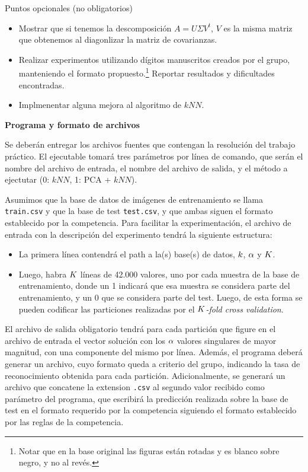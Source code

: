 Puntos opcionales (no obligatorios)

\begin{itemize}
\item Mostrar que si tenemos la descomposici\'on $A = U\Sigma V^t$, $V$ es la misma matriz que obtenemos al diagonlizar la matriz de covarianzas.
\item Realizar experimentos utilizando d\'igitos manuscritos creados por el grupo, manteniendo el formato propuesto.\footnote{Notar que en la base original las figuras est\'an rotadas y es blanco sobre negro, y no al rev\'es.} Reportar resultados y dificultades encontradas.
\item Implmenentar alguna mejora al algoritmo de $kNN$.
\end{itemize}

{\bf\noindent Programa y formato de archivos}

Se deber\'an entregar los archivos fuentes que contengan la resoluci\'on del trabajo pr\'actico. El ejecutable tomar\'a tres par\'ametros por l\'inea de comando, que ser\'an el nombre del archivo de entrada, el nombre del archivo de salida, y el m\'etodo a ejectutar (0: $kNN$, 1: PCA + $kNN$).
	

Asumimos que la base de datos de im\'agenes de entrenamiento se llama \verb+train.csv+ y que la base de test \verb+test.csv+, y que ambas siguen el formato establecido por la competencia. Para facilitar la experimentaci\'on, el archivo de entrada con la descripci\'on del experimento tendr\'a la siguiente estructura: 

\begin{itemize}
\item La primera l\'inea contendr\'a el path a la(s) base(s) de datos, $k$, $\alpha$ y $K$.
\item Luego, habra $K$ l\'ineas de 42.000 valores, uno por cada muestra de la base de entrenamiento, donde un 1 indicar\'a que esa muestra se considera parte del entrenamiento, y un 0 que se considera parte del test. Luego, de esta forma se pueden codificar las particiones realizadas por el \emph{$K$-fold cross validation}.
\end{itemize}

El archivo de salida obligatorio tendr\'a para cada partici\'on que figure en el archivo de entrada el vector soluci\'on con los $\alpha$ valores singulares de mayor magnitud, con una componente del mismo por l\'inea. Adem\'as, el programa deber\'a generar un archivo, cuyo formato queda a criterio del grupo, indicando la tasa de reconocimiento obtenida para cada partici\'on. Adicionalmente, se generar\'a un archivo que concatene la extension \verb+.csv+ al segundo valor recibido como par\'ametro del programa, que escribir\'a la predicci\'on realizada sobre la base de test en el formato requerido por la competencia siguiendo el formato establecido por las reglas de la competencia.

